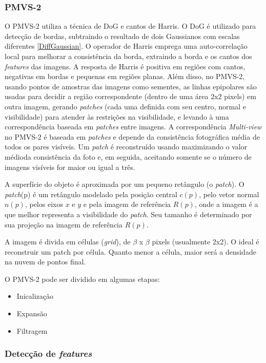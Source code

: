 \begin{itemize}
\subsubsection{PMVS-2}

O PMVS-2 utiliza a técnica de DoG e cantos de Harris. O DoG é utilizado para detecção de bordas, subtraindo o resultado de dois Gaussianos com escalas diferentes \ref{DiffGaussian}. O operador de Harris emprega uma auto-correlação local para melhorar a consistência da borda, extraindo a borda e os cantos dos \emph{features} das imagens. A resposta de Harris é positiva em regiões com cantos, negativas em bordas e pequenas em regiões planas. Além disso, no PMVS-2, usando pontos de amostras das imagens como sementes, as linhas epipolares são usadas para decidir a região correspondente (dentro de uma área 2x2 pixels) em outra imagem, gerando \emph{patches} (cada uma definida com seu centro, normal e visibilidade) para atender às restrições na visibilidade, e levando à uma correspondência baseada em \emph{patches} entre imagens. A correspondência \emph{Multi-view} no PMVS-2 é baseada em \emph{patches} e depende da consistência fotográfica média de todos os pares visíveis. Um \emph{patch} é reconstruído usando maximizando o valor médioda consistência da foto e, em seguida, aceitando somente se o número de imagens visíveis for maior ou igual a três.  

A superfície do objeto é aproximada por um pequeno retângulo (o \emph{patch}).
O \emph{patch}(p) é um retângulo modelado pela posição central $c(p)$, pelo vetor normal $n(p)$, pelos eixos $x$ e $y$ e pela imagem de referência $R(p)$, onde a imagem é a que melhor representa a visibilidade do \emph{patch}. Seu tamanho é determinado por sua projeção na imagem de referência $R(p)$.

A imagem é divida em células (\emph{grid}), de $\beta$ x $\beta$ pixels (usualmente 2x2). O ideal é reconstruir um patch por célula. Quanto menor a célula, maior será a densidade na nuvem de pontos final.

O PMVS-2 pode ser dividido em algumas etapas:

\begin{itemize}
\item{Inicalização}
\item{Expansão}
\item{Filtragem}
\end{itemize}

\subsubsection{Detecção de \emph{features}}


\end{itemize}
